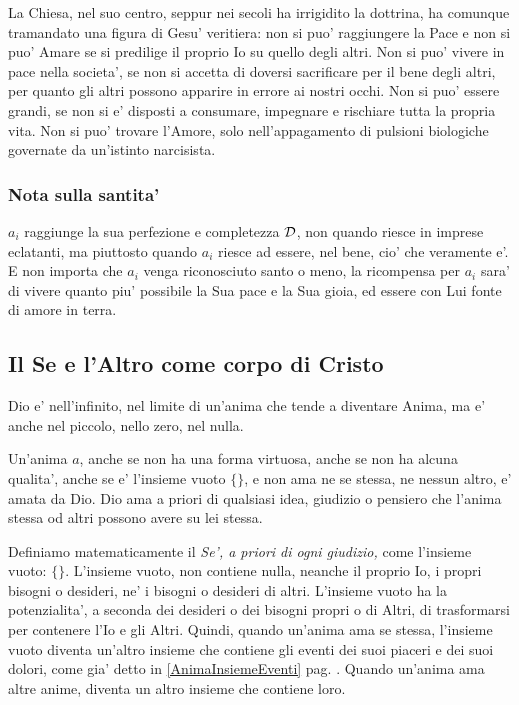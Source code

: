 La Chiesa, nel suo centro, seppur nei secoli ha irrigidito la dottrina, ha comunque tramandato una figura di Gesu' veritiera: non si puo' raggiungere la Pace e non si puo' Amare se si predilige il proprio Io su quello degli altri. Non si puo' vivere in pace nella societa', se non si accetta di doversi sacrificare per il bene degli altri, per quanto gli altri possono apparire in errore ai nostri occhi. Non si puo' essere grandi, se non si e' disposti a consumare, impegnare e rischiare tutta la propria vita. Non si puo' trovare l'Amore, solo nell'appagamento di pulsioni biologiche governate da un'istinto narcisista.

\subsubsection{Nota sulla santita'}
$a_i$ raggiunge la sua perfezione e completezza $\mathcal{D}$, non quando riesce in imprese eclatanti, ma piuttosto quando $a_i$ riesce ad essere, nel bene, cio' che veramente e'. E non importa che $a_i$ venga riconosciuto santo o meno, la ricompensa per $a_i$ sara' di vivere quanto piu' possibile la Sua pace e la Sua gioia, ed essere con Lui fonte di amore in terra.

\subsection{Il Se e l'Altro come corpo di Cristo}

Dio e' nell'infinito, nel limite di un'anima che tende a diventare Anima, ma e' anche nel piccolo, nello zero, nel nulla.

Un'anima $a$, anche se non ha una forma virtuosa, anche se non ha alcuna qualita', anche se e' l'insieme vuoto $\{\}$, e non ama ne se stessa, ne nessun altro, e' amata da Dio. 
Dio ama a priori di qualsiasi idea, giudizio o pensiero che l'anima stessa od altri possono avere su lei stessa.

Definiamo matematicamente il \emph{Se', a priori di ogni giudizio,} come l'insieme vuoto: $\{\}$. L'insieme vuoto, non contiene nulla, neanche il proprio Io, i propri bisogni o desideri, ne' i bisogni o desideri di altri. L'insieme vuoto ha la potenzialita', a seconda dei desideri o dei bisogni propri o di Altri, di trasformarsi per contenere l'Io e gli Altri. Quindi, quando un'anima ama se stessa, l'insieme vuoto diventa un'altro insieme che contiene gli eventi dei suoi piaceri e dei suoi dolori, come gia' detto in \ref{AnimaInsiemeEventi} pag. \pageref{AnimaInsiemeEventi}. Quando un'anima ama altre anime, diventa un altro insieme che contiene loro.

